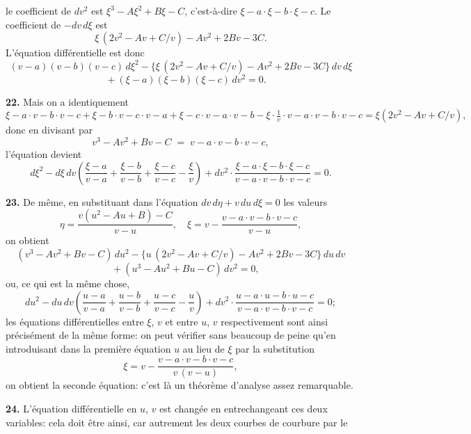 \documentclass[11pt,a4paper]{article}
\begin{document}
le coefficient de $dv^2$ est $\xi^3 - A\xi^2 + B\xi - C$, c'est-\`a-dire $\xi - a\cdot\xi - b\cdot\xi - c$. Le coefficient de $-dv\,d\xi$ est
\[
\xi\,(2 v^2 - A v + C/v) - A v^2 + 2 B v - 3 C.
\]
L'\'equation diff\'erentielle est donc
\[
(v - a)(v - b)(v - c)\,d\xi^2 - \big\{\xi\,(2 v^2 - A v + C/v) - A v^2 + 2 B v - 3 C\big\}\,dv\,d\xi
\]
\[
\quad + (\xi - a)(\xi - b)(\xi - c)\,dv^2 = 0.
\]

\textbf{22.} Mais on a identiquement
\[
\xi - a\cdot v - b\cdot v - c + \xi - b\cdot v - c\cdot v - a + \xi - c\cdot v - a\cdot v - b - \xi\cdot\tfrac{1}{v}\cdot v - a\cdot v - b\cdot v - c = \xi(2 v^2 - A v + C/v),
\]
donc en divisant par
\[
v^3 - A v^2 + B v - C\;=\;v - a\cdot v - b\cdot v - c,
\]
l'\'equation devient
\[
d\xi^2 - d\xi\,dv\!\left(\frac{\xi - a}{v - a} + \frac{\xi - b}{v - b} + \frac{\xi - c}{v - c} - \frac{\xi}{v}\right) + dv^2\cdot\frac{\xi - a\cdot\xi - b\cdot\xi - c}{v - a\cdot v - b\cdot v - c} = 0.
\]

\textbf{23.} De m\^eme, en substituant dans l'\'equation $dv\,d\eta + v\,du\,d\xi = 0$ les valeurs
\[
\eta = \frac{v(u^2 - A u + B) - C}{v - u},\quad \xi = v - \frac{v - a\cdot v - b\cdot v - c}{v - u},
\]
on obtient
\[
(v^3 - A v^2 + B v - C)\,du^2 - \big\{u\,(2 v^2 - A v + C/v) - A v^2 + 2 B v - 3 C\big\}\,du\,dv
\]
\[
\quad + (u^3 - A u^2 + B u - C)\,dv^2 = 0,
\]
ou, ce qui est la m\^eme chose,
\[
du^2 - du\,dv\!\left(\frac{u - a}{v - a} + \frac{u - b}{v - b} + \frac{u - c}{v - c} - \frac{u}{v}\right) + dv^2\cdot\frac{u - a\cdot u - b\cdot u - c}{v - a\cdot v - b\cdot v - c} = 0;
\]
les \'equations diff\'erentielles entre $\xi$, $v$ et entre $u$, $v$ respectivement sont ainsi pr\'ecis\'ement de la m\^eme forme: on peut v\'erifier sans beaucoup de peine qu'en introduisant dans la premi\`ere \'equation $u$ au lieu de $\xi$ par la substitution
\[
\xi = v - \frac{v - a\cdot v - b\cdot v - c}{v\,(v - u)},
\]
on obtient la seconde \'equation: c'est l\`a un th\'eor\`eme d'analyse assez remarquable.

\textbf{24.} L'\'equation diff\'erentielle en $u$, $v$ est chang\'ee en entrechangeant ces deux variables: cela doit \^etre ainsi, car autrement les deux courbes de courbure par le
\end{document}
